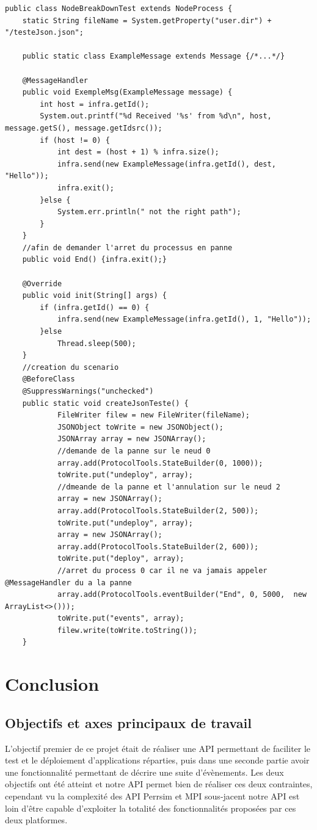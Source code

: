 \documentclass{article}
\begin{document}
			\begin{lstlisting}
public class NodeBreakDownTest extends NodeProcess {
    static String fileName = System.getProperty("user.dir") + "/testeJson.json";

    public static class ExampleMessage extends Message {/*...*/}

    @MessageHandler
    public void ExempleMsg(ExampleMessage message) {
        int host = infra.getId();
        System.out.printf("%d Received '%s' from %d\n", host, message.getS(), message.getIdsrc());
        if (host != 0) {
            int dest = (host + 1) % infra.size();
            infra.send(new ExampleMessage(infra.getId(), dest, "Hello"));
            infra.exit();
        }else {
            System.err.println(" not the right path");
        }
    }
	//afin de demander l'arret du processus en panne			
    public void End() {infra.exit();}

    @Override
    public void init(String[] args) {
        if (infra.getId() == 0) {
            infra.send(new ExampleMessage(infra.getId(), 1, "Hello"));
        }else
            Thread.sleep(500);
	}
	//creation du scenario
	@BeforeClass
    @SuppressWarnings("unchecked")
    public static void createJsonTeste() {
            FileWriter filew = new FileWriter(fileName);
            JSONObject toWrite = new JSONObject();
            JSONArray array = new JSONArray();
            //demande de la panne sur le neud 0
            array.add(ProtocolTools.StateBuilder(0, 1000));
			toWrite.put("undeploy", array);
			//dmeande de la panne et l'annulation sur le neud 2
			array = new JSONArray();
			array.add(ProtocolTools.StateBuilder(2, 500));
			toWrite.put("undeploy", array);
			array = new JSONArray();
			array.add(ProtocolTools.StateBuilder(2, 600));
			toWrite.put("deploy", array);
			//arret du process 0 car il ne va jamais appeler @MessageHandler du a la panne
           	array.add(ProtocolTools.eventBuilder("End", 0, 5000,  new ArrayList<>()));
            toWrite.put("events", array);
            filew.write(toWrite.toString());
    }

		\end{lstlisting}
		\newpage
		\section{Conclusion}
			\subsection{Objectifs et axes principaux de travail}
			L'objectif premier de ce projet était de réaliser une API permettant de faciliter le test et le déploiement d'applications réparties, puis dans une seconde partie avoir une 
			fonctionnalité permettant de décrire une suite d'évènements. 
			\newline
			Les deux objectifs ont été atteint et notre API permet bien de réaliser ces deux contraintes,
			cependant vu la complexité des API Perrsim et MPI sous-jacent notre API est loin d'être capable d'exploiter la totalité des fonctionnalités proposées par ces deux platformes.
\end{document}
